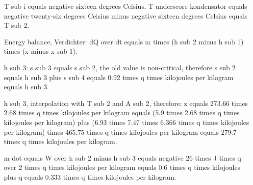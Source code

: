 T sub i equals negative sixteen degrees Celsius. T underscore kondensator equals negative twenty-six degrees Celsius minus negative sixteen degrees Celsius equals T sub 2.

Energy balance, Verdichter: dQ over dt equals m times (h sub 2 minus h sub 1) times (x minus x sub 1).

h sub 3: s sub 3 equals s sub 2, the old value is non-critical, therefore s sub 2 equals h sub 3 plus s sub 4 equals 0.92 times q times kilojoules per kilogram equals h sub 3.

h sub 3, interpolation with T sub 2 and A sub 2, therefore: z equals 273.66 times 2.68 times q times kilojoules per kilogram equals (5.9 times 2.68 times q times kilojoules per kilogram) plus (6.93 times 7.47 times 6.366 times q times kilojoules per kilogram) times 465.75 times q times kilojoules per kilogram equals 279.7 times q times kilojoules per kilogram.

m dot equals W over h sub 2 minus h sub 3 equals negative 26 times J times q over 2 times q times kilojoules per kilogram equals 0.6 times q times kilojoules plus q equals 0.333 times q times kilojoules per kilogram.